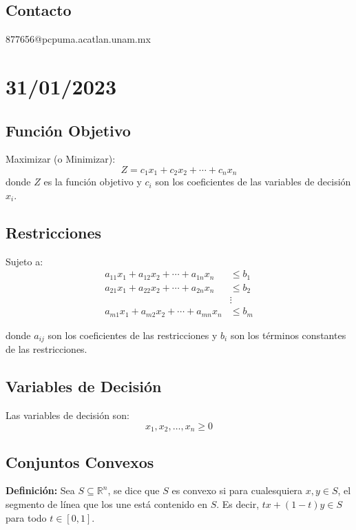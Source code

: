 \documentclass{article}
\begin{document}
\subsection{Contacto}

877656@pcpuma.acatlan.unam.mx

\section{31/01/2023}

\subsection{Función Objetivo}
Maximizar (o Minimizar):
\begin{equation}
    Z = c_1x_1 + c_2x_2 + \cdots + c_nx_n
\end{equation}
donde $Z$ es la función objetivo y $c_i$ son los coeficientes de las variables de decisión $x_i$.

\subsection{Restricciones}
Sujeto a:
\begin{align}
    a_{11}x_1 + a_{12}x_2 + \cdots + a_{1n}x_n & \leq b_1         \\
    a_{21}x_1 + a_{22}x_2 + \cdots + a_{2n}x_n & \leq b_2         \\
                                               & \vdots \nonumber \\
    a_{m1}x_1 + a_{m2}x_2 + \cdots + a_{mn}x_n & \leq b_m
\end{align}

donde $a_{ij}$ son los coeficientes de las restricciones y $b_i$ son los términos constantes de las restricciones.

\subsection{Variables de Decisión}
Las variables de decisión son:
\begin{equation}
    x_1, x_2, \ldots, x_n \geq 0
\end{equation}

\subsection{Conjuntos Convexos}

\textbf{Definición:} Sea \( S \subseteq \mathbb{R}^n \), se dice que \( S \) es convexo si para cualesquiera \( x, y \in S \), el segmento de línea que los une está contenido en \( S \). Es decir, \( tx + (1-t)y \in S \) para todo \( t \in [0,1] \).
\end{document}
